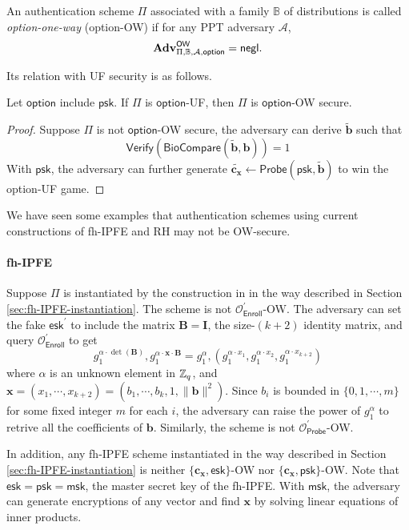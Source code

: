 An authentication scheme $\Pi$ associated with a family $\mathbb{B}$ of distributions is called \emph{\textsf{option}-one-way} (\textsf{option}-OW) if for any PPT adversary $\mathcal{A}$,
\[
	\mathbf{Adv}^{\textsf{OW}}_{\Pi, \mathbb{B}, \mathcal{A}, \textsf{option}} = \mathsf{negl}.
\]

Its relation with UF security is as follows.

\begin{theorem}
	Let $\textsf{option}$ include $\textsf{psk}$. If $\Pi$ is $\textsf{option}$-UF, then $\Pi$ is $\textsf{option}$-OW secure.
\end{theorem}

\begin{proof}
	Suppose $\Pi$ is not $\textsf{option}$-OW secure, the adversary can derive $\tilde{\mathbf{b}}$ such that 
	\[
		\textsf{Verify}(\textsf{BioCompare}(\tilde{\mathbf{b}}, \mathbf{b})) = 1
	\]
	With $\textsf{psk}$, the adversary can further generate $\tilde{\mathbf{c_x}} \gets \textsf{Probe}(\textsf{psk}, \tilde{\mathbf{b}})$ to win the \textsf{option-UF} game.
\end{proof}

We have seen some examples that authentication schemes using current constructions of fh-IPFE and RH may not be OW-secure.

\paragraph{fh-IPFE}

Suppose $\Pi$ is instantiated by the construction in \cite{cryptoeprint:2016/440} in the way described in Section \ref{sec:fh-IPFE-instantiation}. The scheme is not $\mathcal{O}_{\textsf{Enroll}}^\prime$-OW. The adversary can set the fake $\textsf{esk}^\prime$ to include the matrix $\mathbf{B} = \mathbf{I}$, the size-$(k+2)$ identity matrix, and query $\mathcal{O}_{\textsf{Enroll}}^\prime$ to get
\[
	g_1^{\alpha \cdot \det(\mathbf{B})}, g_1^{\alpha \cdot \mathbf{x} \cdot \mathbf{B}} = g_1^{\alpha}, (g_1^{\alpha \cdot {x_1}}, g_1^{\alpha \cdot {x_2}}, g_1^{\alpha \cdot {x_{k+2}}}) 
\]
where $\alpha$ is an unknown element in $\mathbb{Z}_q$, and $\mathbf{x} = (x_1, \cdots, x_{k+2}) = (b_1, \cdots, b_k, 1, \|\mathbf{b}\|^2)$. Since $b_i$ is bounded in $\{0, 1, \cdots, m\}$ for some fixed integer $m$ for each $i$, the adversary can raise the power of $g_1^{\alpha}$ to retrive all the coefficients of $\mathbf{b}$. Similarly, the scheme is not $\mathcal{O}_{\textsf{Probe}}^\prime$-OW.

In addition, any fh-IPFE scheme instantiated in the way described in Section \ref{sec:fh-IPFE-instantiation} is neither $\{ \mathbf{c_x}, \textsf{esk} \}$-OW nor $\{ \mathbf{c_x}, \textsf{psk} \}$-OW. Note that $\textsf{esk} = \textsf{psk} = \textsf{msk}$, the master secret key of the fh-IPFE. With $\textsf{msk}$, the adversary can generate encryptions of any vector and find $\mathbf{x}$ by solving linear equations of inner products.

